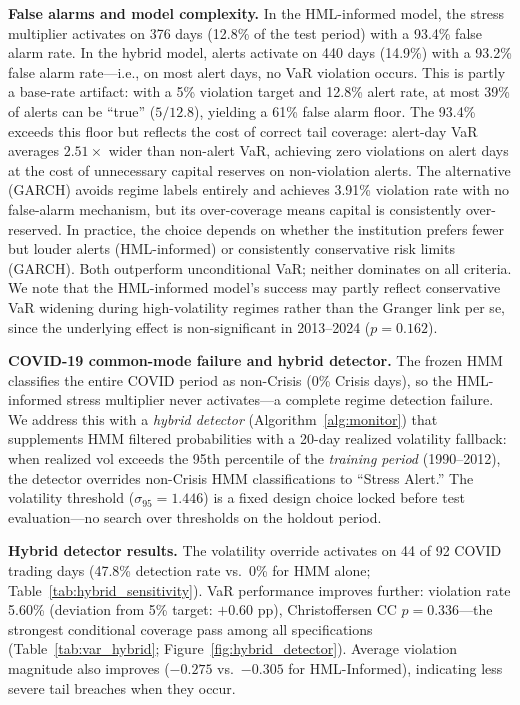 \documentclass[sigconf,anonymous]{acmart}
\begin{document}
\textbf{False alarms and model complexity.}
In the HML-informed model, the stress multiplier activates on 376 days
(12.8\% of the test period) with a 93.4\% false alarm rate. In the hybrid model,
alerts activate on 440 days (14.9\%) with a 93.2\% false alarm rate---i.e., on
most alert days, no VaR violation occurs.
This is partly a base-rate artifact: with a 5\% violation target and 12.8\%
alert rate, at most 39\% of alerts can be ``true'' ($5/12.8$), yielding a
61\% false alarm floor. The 93.4\% exceeds this floor but reflects the cost
of correct tail coverage: alert-day VaR averages $2.51\times$ wider than
non-alert VaR, achieving zero violations on alert days at the cost of
unnecessary capital reserves on non-violation alerts.
The alternative (GARCH) avoids regime labels entirely and achieves
3.91\% violation rate with no false-alarm mechanism, but its over-coverage means
capital is consistently over-reserved. In practice, the choice depends on whether
the institution prefers fewer but louder alerts (HML-informed) or consistently
conservative risk limits (GARCH). Both outperform unconditional VaR; neither
dominates on all criteria.
We note that the HML-informed model's success may partly reflect conservative
VaR widening during high-volatility regimes rather than the Granger link per se,
since the underlying effect is non-significant in 2013--2024 ($p = 0.162$).

\textbf{COVID-19 common-mode failure and hybrid detector.}
The frozen HMM classifies the entire COVID period as non-Crisis (0\% Crisis days),
so the HML-informed stress multiplier never activates---a complete regime detection
failure. We address this with a \emph{hybrid detector} (Algorithm~\ref{alg:monitor})
that supplements HMM filtered probabilities with a 20-day realized volatility
fallback: when realized vol exceeds the 95th percentile of the \emph{training period}
(1990--2012), the detector overrides non-Crisis HMM classifications to ``Stress Alert.''
The volatility threshold ($\sigma_{95} = 1.446$) is a fixed design choice locked
before test evaluation---no search over thresholds on the holdout period.

\textbf{Hybrid detector results.} The volatility override activates on 44 of 92
COVID trading days (47.8\% detection rate vs.\ 0\% for HMM alone;
Table~\ref{tab:hybrid_sensitivity}). VaR performance improves further:
violation rate 5.60\% (deviation from 5\% target: $+0.60$ pp), Christoffersen
CC $p = 0.336$---the strongest conditional coverage pass among all specifications
(Table~\ref{tab:var_hybrid}; Figure~\ref{fig:hybrid_detector}). Average violation magnitude also improves
($-0.275$ vs.\ $-0.305$ for HML-Informed), indicating less severe tail breaches
when they occur.
\end{document}
